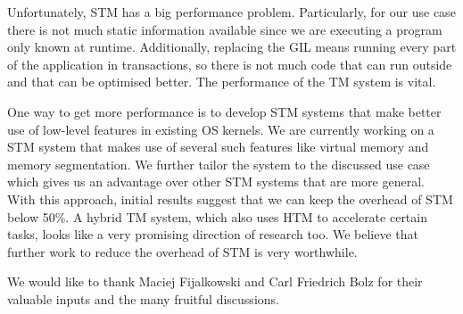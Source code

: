 \documentclass{sigplanconf}
\begin{document}
Unfortunately, STM has a big performance problem. Particularly, for
our use case there is not much static information available since we
are executing a program only known at runtime. Additionally, replacing
the GIL means running every part of the application in transactions,
so there is not much code that can run outside and that can be
optimised better. The performance of the TM system is vital.

One way to get more performance is to develop STM systems that make
better use of low-level features in existing OS kernels.  We are
currently working on a STM system that makes use of several such
features like virtual memory and memory segmentation.  We further
tailor the system to the discussed use case which gives us an
advantage over other STM systems that are more general. With this
approach, initial results suggest that we can keep the overhead of STM
below 50\%. A hybrid TM system, which also uses HTM to accelerate
certain tasks, looks like a very promising direction of research
too. We believe that further work to reduce the overhead of STM is
very worthwhile.








\acks
We would like to thank Maciej Fijalkowski and Carl Friedrich Bolz for
their valuable inputs and the many fruitful discussions.




\end{document}
